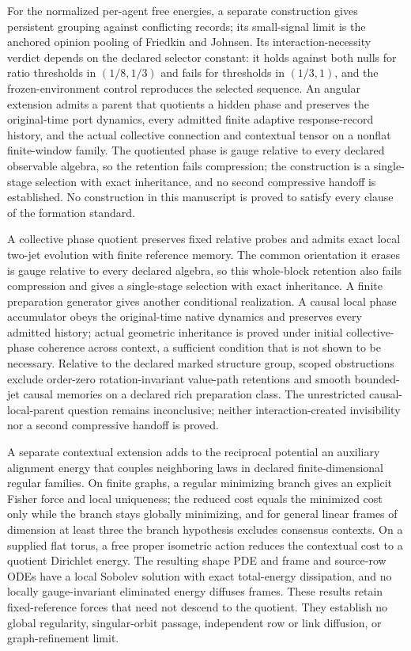 For the normalized per-agent free energies, a separate construction gives persistent grouping against conflicting records; its small-signal limit is the anchored opinion pooling of Friedkin and Johnsen. Its interaction-necessity verdict depends on the declared selector constant: it holds against both nulls for ratio thresholds in $(1/8,1/3)$ and fails for thresholds in $(1/3,1)$, and the frozen-environment control reproduces the selected sequence. An angular extension admits a parent that quotients a hidden phase and preserves the original-time port dynamics, every admitted finite adaptive response-record history, and the actual collective connection and contextual tensor on a nonflat finite-window family. The quotiented phase is gauge relative to every declared observable algebra, so the retention fails compression; the construction is a single-stage selection with exact inheritance, and no second compressive handoff is established. No construction in this manuscript is proved to satisfy every clause of the formation standard.

A collective phase quotient preserves fixed relative probes and admits exact local two-jet evolution with finite reference memory. The common orientation it erases is gauge relative to every declared algebra, so this whole-block retention also fails compression and gives a single-stage selection with exact inheritance. A finite preparation generator gives another conditional realization. A causal local phase accumulator obeys the original-time native dynamics and preserves every admitted history; actual geometric inheritance is proved under initial collective-phase coherence across context, a sufficient condition that is not shown to be necessary. Relative to the declared marked structure group, scoped obstructions exclude order-zero rotation-invariant value-path retentions and smooth bounded-jet causal memories on a declared rich preparation class. The unrestricted causal-local-parent question remains inconclusive; neither interaction-created invisibility nor a second compressive handoff is proved.

A separate contextual extension adds to the reciprocal potential an auxiliary alignment energy that couples neighboring laws in declared finite-dimensional regular families. On finite graphs, a regular minimizing branch gives an explicit Fisher force and local uniqueness; the reduced cost equals the minimized cost only while the branch stays globally minimizing, and for general linear frames of dimension at least three the branch hypothesis excludes consensus contexts. On a supplied flat torus, a free proper isometric action reduces the contextual cost to a quotient Dirichlet energy. The resulting shape PDE and frame and source-row ODEs have a local Sobolev solution with exact total-energy dissipation, and no locally gauge-invariant eliminated energy diffuses frames. These results retain fixed-reference forces that need not descend to the quotient. They establish no global regularity, singular-orbit passage, independent row or link diffusion, or graph-refinement limit.

